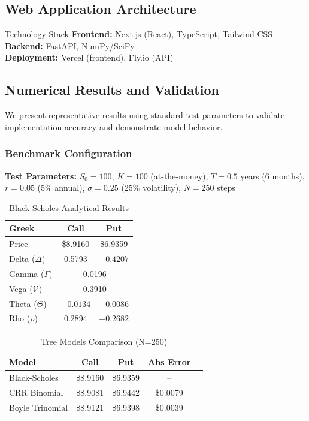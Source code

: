 \documentclass[10pt,twocolumn]{article}
\begin{document}
\subsection{Web Application Architecture}

\begin{keybox}{Technology Stack}
\textbf{Frontend:} Next.js (React), TypeScript, Tailwind CSS\\
\textbf{Backend:} FastAPI, NumPy/SciPy\\
\textbf{Deployment:} Vercel (frontend), Fly.io (API)
\end{keybox}



\subsection{Numerical Results and Validation}

We present representative results using standard test parameters to validate implementation accuracy and demonstrate model behavior.

\subsubsection{Benchmark Configuration}

\textbf{Test Parameters:} $S_0 = 100$, $K = 100$ (at-the-money), $T = 0.5$ years (6 months), $r = 0.05$ (5\% annual), $\sigma = 0.25$ (25\% volatility), $N = 250$ steps

\begin{table}[H]
\centering
\caption{Black-Scholes Analytical Results}
\begin{tabular}{@{}lcc@{}}
\toprule
\textbf{Greek} & \textbf{Call} & \textbf{Put} \\
\midrule
Price & \$8.9160 & \$6.9359 \\
Delta ($\Delta$) & 0.5793 & $-0.4207$ \\
Gamma ($\Gamma$) & \multicolumn{2}{c}{0.0196} \\
Vega ($\mathcal{V}$) & \multicolumn{2}{c}{0.3910} \\
Theta ($\Theta$) & $-0.0134$ & $-0.0086$ \\
Rho ($\rho$) & 0.2894 & $-0.2682$ \\
\bottomrule
\end{tabular}
\end{table}

\begin{table}[H]
\centering
\caption{Tree Models Comparison (N=250)}
\begin{tabular}{@{}lcccc@{}}
\toprule
\textbf{Model} & \textbf{Call} & \textbf{Put} & \textbf{Abs Error} \\
\midrule
Black-Scholes & \$8.9160 & \$6.9359 & --\\
CRR Binomial & \$8.9081 & \$6.9442 & \$0.0079  \\
Boyle Trinomial & \$8.9121 & \$6.9398 & \$0.0039  \\
\bottomrule
\end{tabular}
\end{table}
\end{document}
